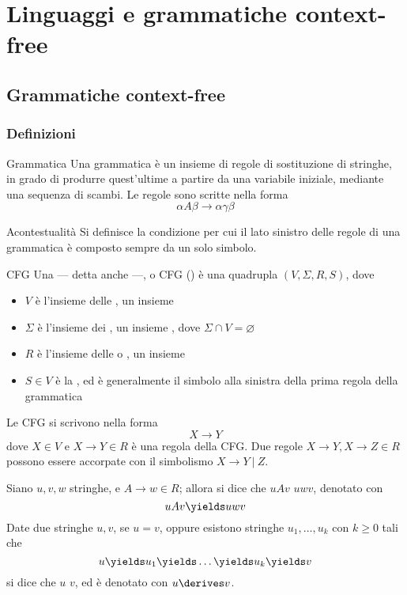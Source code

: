 \documentclass[a4paper, 12pt]{report}
\begin{document}
    \chapter{Linguaggi e grammatiche context-free}

    \section{Grammatiche context-free}

    \subsection{Definizioni}

    \begin{frameddefn}{Grammatica}
        Una grammatica è un insieme di regole di sostituzione di stringhe, in grado di produrre quest'ultime a partire da una variabile iniziale, mediante una sequenza di scambi. Le regole sono scritte nella forma $$\alpha A \beta \to \alpha \gamma \beta$$
    \end{frameddefn}

    \begin{frameddefn}{Acontestualità}
        Si definisce  la condizione per cui il lato sinistro delle regole di una grammatica è composto sempre da un solo simbolo.
    \end{frameddefn}

    \begin{frameddefn}{CFG}
        Una  --- detta anche  ---, o CFG () è una quadrupla $(V, \Sigma, R, S)$, dove

        \begin{itemize}
            \item $V$ è l'insieme delle , un insieme 
            \item $\Sigma$ è l'insieme dei , un insieme , dove $\Sigma \cap V = \varnothing$
            \item $R$ è l'insieme delle  o , un insieme 
            \item $S \in V$ è la , ed è generalmente il simbolo alla sinistra della prima regola della grammatica
        \end{itemize}

        Le CFG si scrivono nella forma $$X \to Y$$ dove $X \in V$ e $X \to Y \in R$ è una regola della CFG. Due regole $X \to Y, X \to Z \in R$ possono essere accorpate con il simbolismo $X \to Y \ | \ Z$.

        Siano $u, v, w$ stringhe, e $A \to w \in R$; allora si dice che $uAv$  $uwv$, denotato con $$uAv \yields uwv$$ Date due stringhe $u, v$, se $u = v$, oppure esistono stringhe $u_1, \ldots, u_k$ con $k \ge 0$ tali che $$u \yields u_1 \yields \ldots \yields u_k \yields v$$ si dice che $u$  $v$, ed è denotato con $u \derives v$.
    \end{frameddefn}
\end{document}
